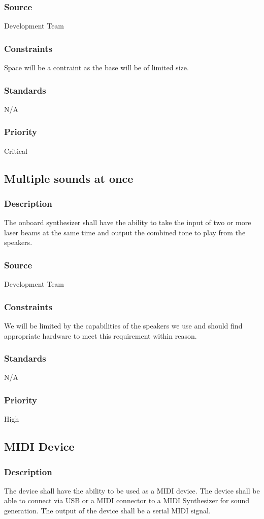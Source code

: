 \subsubsection{Source}
Development Team
\subsubsection{Constraints}
Space will be a contraint as the base will be of limited size.
\subsubsection{Standards}
N/A
\subsubsection{Priority}
Critical

\subsection{Multiple sounds at once}
\subsubsection{Description}
The onboard synthesizer shall have the ability to take the input of two or more laser beams at the same time and output the combined tone to play from the speakers.  
\subsubsection{Source}
Development Team
\subsubsection{Constraints}
We will be limited by the capabilities of the speakers we use and should find appropriate hardware to meet this requirement within reason.
\subsubsection{Standards}
N/A
\subsubsection{Priority}
High


\subsection{MIDI Device}
\subsubsection{Description}
The device shall have the ability to be used as a MIDI device. The device shall be able to connect via USB or a MIDI connector to a MIDI Synthesizer for sound generation. The output of the device shall be a serial MIDI signal.
